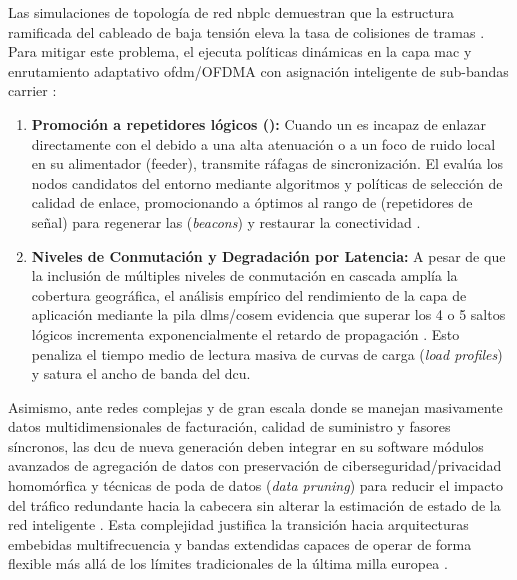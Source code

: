 Las simulaciones de topología de red \gls{nbplc} demuestran que la estructura ramificada del cableado de baja tensión eleva la tasa de colisiones de tramas \cite{8704772}. Para mitigar este problema, el  ejecuta políticas dinámicas en la capa \gls{mac} y enrutamiento adaptativo \gls{ofdm}/OFDMA con asignación inteligente de sub-bandas carrier \cite{8362574}:
\begin{enumerate}
    \item \textbf{Promoción a repetidores lógicos ():} Cuando un  es incapaz de enlazar directamente con el  debido a una alta atenuación o a un foco de ruido local en su alimentador (feeder), transmite ráfagas de sincronización. El  evalúa los nodos candidatos del entorno mediante algoritmos y políticas de selección de calidad de enlace, promocionando a  óptimos al rango de \textbf{} (repetidores de señal) para regenerar las  (\textit{beacons}) y restaurar la conectividad \cite{8693361}.
    \item \textbf{Niveles de Conmutación y Degradación por Latencia:} A pesar de que la inclusión de múltiples niveles de conmutación en cascada amplía la cobertura geográfica, el análisis empírico del rendimiento de la capa de aplicación mediante la pila \gls{dlms}/\gls{cosem} evidencia que superar los 4 o 5 saltos lógicos incrementa exponencialmente el retardo de propagación \cite{7778783}. Esto penaliza el tiempo medio de lectura masiva de curvas de carga (\textit{load profiles}) y satura el ancho de banda del \gls{dcu}.
\end{enumerate}

Asimismo, ante redes complejas y de gran escala donde se manejan masivamente datos multidimensionales de facturación, calidad de suministro y fasores síncronos, las \gls{dcu} de nueva generación deben integrar en su software módulos avanzados de agregación de datos con preservación de ciberseguridad/privacidad homomórfica y técnicas de poda de datos (\textit{data pruning}) para reducir el impacto del tráfico redundante hacia la cabecera sin alterar la estimación de estado de la red inteligente \cite{9313012, 10268020}. Esta complejidad justifica la transición hacia arquitecturas embebidas multifrecuencia y bandas extendidas capaces de operar de forma flexible más allá de los límites tradicionales de la última milla europea \cite{7007657}.

